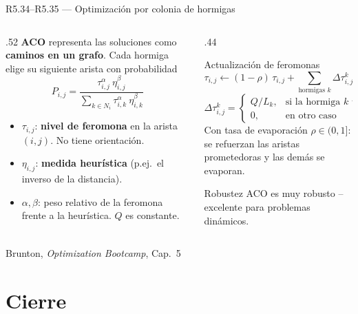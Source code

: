 \documentclass[10pt,aspectratio=169]{beamer}
\newcommand{\fuente}{\vfill{\scriptsize\color{gray}Brunton, \emph{Optimization Bootcamp}, Cap.~5}}
\begin{document}
\begin{frame}{R5.34--R5.35 --- Optimización por colonia de hormigas}
  \small
  \begin{columns}[T,onlytextwidth]
    \begin{column}{.52\textwidth}
      \textbf{ACO } representa las soluciones como
      \textbf{caminos en un grafo}. Cada hormiga elige su siguiente arista con
      probabilidad
      \[
        P_{i,j} = \frac{\tau_{i,j}^{\alpha}\ \eta_{i,j}^{\beta}}
        {\sum_{k \in N_i} \tau_{i,k}^{\alpha}\ \eta_{i,k}^{\beta}}
      \]
      \begin{itemize}
          \item $\tau_{i,j}$: \textbf{nivel de feromona} en la arista $(i,j)$. No tiene orientación.
        \item $\eta_{i,j}$: \textbf{medida heurística} (p.ej.~el inverso de la
          distancia).
        \item $\alpha,\beta$: peso relativo de la feromona frente a la
            heurística. $Q$ es constante.
      \end{itemize}
    \end{column}
    \begin{column}{.44\textwidth}
      \begin{block}{Actualización de feromonas}
        \small
        \[
          \tau_{i,j} \leftarrow (1-\rho)\,\tau_{i,j}
          + \sum_{\text{hormigas }k} \Delta\tau_{i,j}^{k}
        \]
        \[
          \Delta\tau_{i,j}^{k} = \begin{cases}
            Q/L_k, & \text{si la hormiga } k \text{ usó } (i,j)\\
            0, & \text{en otro caso}
          \end{cases}
        \]
        Con tasa de evaporación $\rho\in(0,1]$: se refuerzan las aristas
        prometedoras y las demás se evaporan.
      \end{block}
      \begin{block}{Robustez}
        \small
        ACO es muy robusto -- excelente para problemas dinámicos.
    \end{block}
    \end{column}
  \end{columns}
  \fuente
\end{frame}

\section{Cierre}
\end{document}
